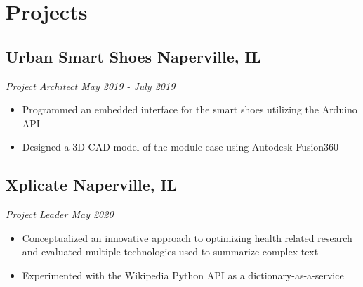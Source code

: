 \documentclass[10pt]{article}
\newcommand{\positiontitle}[1]
        {
            \hspace{-1.8em}
            \textit{#1}
        }
\newcommand{\makepositionheader}[2]
    {
        \subsection{#1 \hfill {\normalsize #2}}
    }
\newcommand{\makepositiondesc}[2]
    {
        \positiontitle{#1 \hfill {\normalsize #2}}    
    }
\newcommand{\contentitem}
    {
        \item\small
    }
\begin{document}
                                                \section{Projects}
                                    \makepositionheader{Urban Smart Shoes}{Naperville, IL}
                                    \makepositiondesc{Project Architect}{May 2019 - July 2019}
                    \begin{itemize}
                                                    \contentitem Programmed an embedded interface for the smart shoes utilizing the Arduino API
                                                    \contentitem Designed a 3D CAD model of the module case using Autodesk Fusion360
                                            \end{itemize}
                                            \makepositionheader{Xplicate}{Naperville, IL}
                                    \makepositiondesc{Project Leader}{May 2020}
                    \begin{itemize}
                                                    \contentitem Conceptualized an innovative approach to optimizing health related research and evaluated multiple technologies used to summarize complex text
                                                    \contentitem Experimented with the Wikipedia Python API as a dictionary-as-a-service
                                            \end{itemize}
\end{document}
